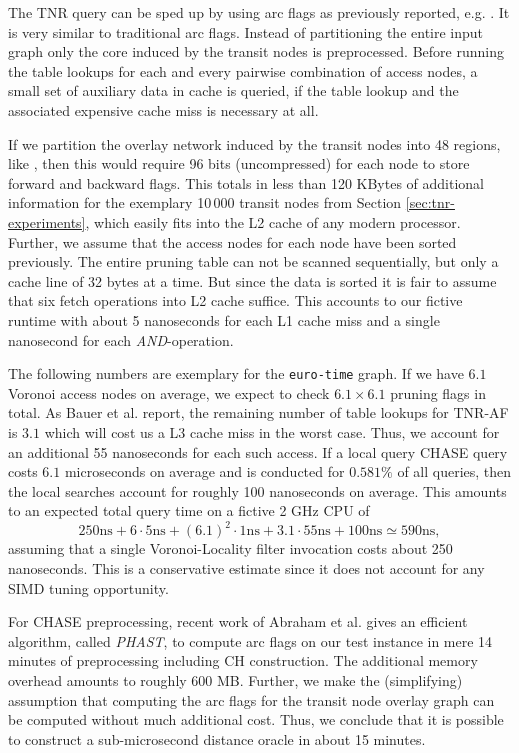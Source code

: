 \documentclass{llncs}
\newcommand{\etal}{et al.\xspace}
\begin{document}
The TNR query can be sped up by using arc flags as previously reported, e.g. \cite{bdsssw-chgds-08}.
It is very similar to traditional arc flags.
Instead of partitioning the entire input graph only the core induced by the transit nodes is preprocessed.
Before running the table lookups for each and every pairwise combination of access nodes, a small set of auxiliary data in cache is queried, if the table lookup and the associated expensive cache miss is necessary at all.

If we partition the overlay network induced by the transit nodes into 48 regions, like \cite{d-earpa-09}, then this would require 96 bits (uncompressed) for each node to store forward and backward flags.
This totals in less than 120 KBytes of additional information for the exemplary 10\,000 transit nodes from Section \ref{sec:tnr-experiments}, which easily fits into the L2 cache of any modern processor.
Further, we assume that the access nodes for each node have been sorted previously.
The entire pruning table can not be scanned sequentially, but only a cache line of 32 bytes at a time.
But since the data is sorted it is fair to assume that six fetch operations into L2 cache suffice.
This accounts to our fictive runtime with about 5 nanoseconds for each L1 cache miss and a single nanosecond for each \emph{AND}-operation.

The following numbers are exemplary for the \texttt{euro-time} graph.
If we have $6.1$ Voronoi access nodes on average, we expect to check $6.1\times6.1$ pruning flags in total.
As Bauer \etal report, the remaining number of table lookups for TNR-AF is $3.1$ which will cost us a L3 cache miss in the worst case.
Thus, we account for an additional 55 nanoseconds for each such access.
If a local query CHASE query costs $6.1$ microseconds on average \cite{dgnw-phast-12} and is conducted for $0.581\%$ of all queries, then the local searches account for roughly 100 nanoseconds on average.
This amounts to an expected total query time on a fictive 2 GHz CPU of
$$250 \text{ns} + 6\cdot 5 \text{ns} + (6.1)^2\cdot 1 \text{ns} + 3.1\cdot 55 \text{ns} + 100 \text{ns} \simeq 590 \text{ns} , $$
assuming that a single Voronoi-Locality filter invocation costs about 250 nanoseconds.
This is a conservative estimate since it does not account for any SIMD tuning opportunity.

For CHASE preprocessing, recent work of Abraham \etal \cite{dgnw-phast-12} gives an efficient algorithm, called \emph{PHAST}, to compute arc flags on our test instance in mere 14 minutes of preprocessing including CH construction.
The additional memory overhead amounts to roughly 600 MB.
Further, we make the (simplifying) assumption that computing the arc flags for the transit node overlay graph can be computed without much additional cost.
Thus, we conclude that it is possible to construct a sub-microsecond distance oracle in about 15 minutes.
\end{document}

